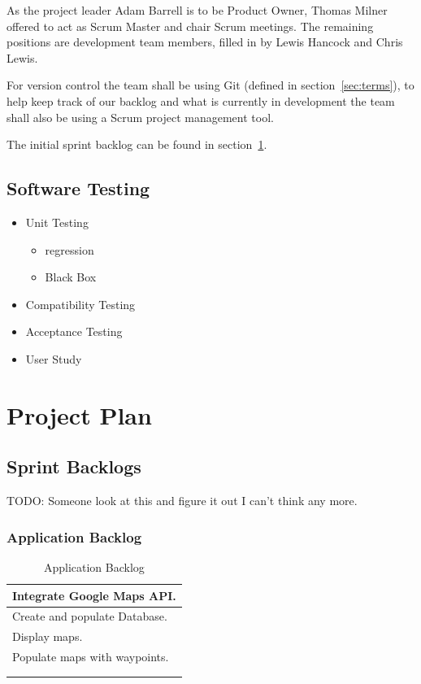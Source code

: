 \documentclass[11pt,a4paper]{article}
\begin{document}
As the project leader Adam Barrell is to be Product Owner, Thomas Milner offered to act as Scrum Master and chair Scrum meetings. The remaining positions are development team members, filled in by Lewis Hancock and Chris Lewis. 

For version control the team shall be using Git (defined in section~\ref{sec:terms}), to help keep track of our backlog and what is currently in development the team shall also be using a Scrum project management tool.

The initial sprint backlog can be found in section~\ref{sec:project-plan}.

\subsection{Software Testing}
\begin{itemize}
\item Unit Testing
	\begin{itemize}
	\item regression
	\item Black Box
	\end{itemize}

\item Compatibility Testing
\item Acceptance Testing
\item User Study
\end{itemize}

\section{Project Plan}
\label{sec:project-plan}

\subsection{Sprint Backlogs}
TODO: Someone look at this and figure it out I can't think any more.
\subsubsection{Application Backlog}
\begin{table}[H]
\centering
\begin{tabular}{|l|}
\hline
Integrate Google Maps API. \\ \hline
Create and populate Database. \\ \hline
Display maps. \\ \hline
Populate maps with waypoints. \\ \hline
 \\ \hline
 \\ \hline
\end{tabular}
\caption{Application Backlog}
\label{tab:appBacklog}
\end{table}
\end{document}
